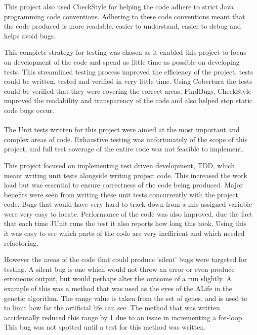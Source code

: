 \documentclass[12pt]{article}
\begin{document}
This project also used
CheckStyle for helping the code adhere to strict Java programming code conventions. Adhering to these code conventions meant that
the code produced is more readable, easier to understand, easier to debug and helps avoid bugs.

This complete strategy for testing was chosen as it enabled this project to focus on development of the code and spend as little
time as possible on developing tests. This streamlined testing process improved the efficiency of the project, tests could 
be written, tested and verified in very little time. Using Cobertura the tests could be verified that they were covering the
correct areas, FindBugs, CheckStyle improved the readability and transparency of the code and also helped stop static code
bugs occur.


\paragraph{}

The Unit tests written for this project were aimed at the most important and complex areas of code. Exhaustive testing was 
unfortunately of the scope of this project, and full test coverage of the entire code was not feasible to implement.

This project focused on implementing test driven development, TDD, which meant writing unit tests alongside writing project code.
This increased the work load but was essential to ensure correctness of the code being produced. Major benefits were seen from
writing these unit tests concurrently with the project code. Bugs that would have very hard to track down from a mis-assigned
variable were very easy to locate. Performance of the code was also improved, due the fact that each time JUnit runs the test
it also reports how long this took. Using this it was easy to see which parts of the code are very inefficient and which needed
refactoring. 

However the 
areas of the code that could produce 'silent' bugs were targeted for testing. A silent bug is one which would not throw an error
or even produce erroneous output, but would perhaps alter the outcome of a run slightly. A example of this was a method that
was used as the eyes of the ALife in the genetic algorithm. The range value is taken from the set of genes, and is used to 
to limit how far the artificial life can see. The method that was written accidentally reduced this range by 1 due to an issue
in incrementing a for-loop. This bug was not spotted until a test for this method was written. 
\end{document}
